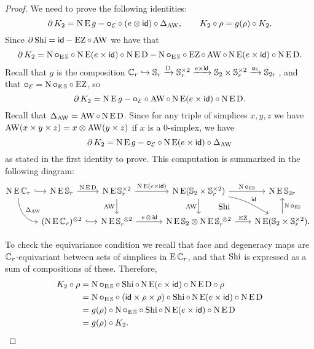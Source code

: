\begin{proof}
	We need to prove the following identities:
	\[
	\bd K_2 =  \chains\EE g - \bcirc_{\BE} \comp (e \ot \id) \comp \Delta_{\AW},
	\qquad
	K_2 \comp \rho = g(\rho) \comp K_2.
	\]
	Since $\bd \Shi = \id - \EZ \comp \AW$ we have that
	\[
	\bd K_2 =
	\chains\bcirc_{\EE\sym} \comp \chains\EE(e \times \id) \comp \chains\EE\rD -
	\chains\bcirc_{\EE\sym} \comp \EZ \comp \AW \comp \chains\EE(e \times \id) \comp \chains\EE\rD.
	\]
	Recall that $g$ is the composition $\cyc_r \hookrightarrow \sym_r \xra{\rD} \sym_r^{\times 2} \xra{e \times \id} \sym_2 \times \sym_r^{\times 2} \xra{\bcirc_{\sym}} \sym_{2r}$\,, and that $\bcirc_{\BE} = \chains\bcirc_{\EE\sym} \comp \EZ$, so
	\[
	\bd K_2 =
	\chains\EE g -
	\bcirc_{\BE} \comp \AW \comp \chains\EE(e \times \id) \comp \chains\EE\rD.
	\]
	Recall that $\Delta_{\AW} = \AW \comp \chains\EE\rD$.
	Since for any triple of simplices $x,y,z$ we have $\AW(x \times y \times z) = x \ot \AW(y \times z)$ if $x$ is a $0$-simplex, we have
	\[
	\bd K_2 =
	\chains\EE g -
	\bcirc_{\BE} \comp \chains\EE(e \times \id) \comp \Delta_{\AW}
	\]
	as stated in the first identity to prove.
	This computation is summarized in the following diagram:
	\[
	\hspace*{-4pt}
	\begin{tikzcd}
		\chains\EE\cyc_r
		\rar[hook]
		\arrow[dr,in=180,out=-90,"\Delta_{\AW}"]
		&[-20pt]
		\chains\EE\sym_r
		\rar["\chains\EE\rD"] &[-10pt]
		\chains\EE\sym_r^{\times 2}
		\rar["\chains\EE(e \times \id)"]
		\dar["\AW"'] &[7pt]
		\chains\EE(\sym_2 \times \sym_r^{\times 2})
		\rar["\chains\bcirc_{\EE\!\sym}"]
		\dar["\AW"']
		\drar["\id",out=-10,in=150] &[-5pt]
		\chains\EE\sym_{2r} \\ &
		(\chains\EE\cyc_r)^{\ot 2}
		\arrow[r,hook] &
		\chains\EE\sym_r^{\ \ot 2}
		\rar["e \,\ot\, \id"] &
		\chains\EE\sym_2 \ot \chains\EE\sym_r^{\ \ot 2}
		\rar["\EZ"]
		\uar["\Shi",phantom,shift right=30pt] &
		\chains\EE(\sym_2 \times \sym_r^{\times 2}).
		\uar["\chains\bcirc_{\EE\!\sym}"']
	\end{tikzcd}
	\]

	To check the equivariance condition we recall that face and degeneracy maps are $\cyc_r$-equivariant between sets of simplices in $\EE\cyc_r$, and that $\Shi$ is expressed as a sum of compositions of these.
	Therefore,
	\begin{align*}
		K_2 \comp \rho &=
		\chains\bcirc_{\EE\sym} \comp \Shi \comp \chains\EE(e \times \id) \comp \chains\EE\rD \comp \rho \\ &=
		\chains\bcirc_{\EE\sym} \comp (\id \times \rho \times \rho) \comp \Shi \comp \chains\EE(e \times \id) \comp \chains\EE\rD  \\ &=
		g(\rho) \comp \chains\bcirc_{\EE\sym} \comp \Shi \comp \chains\EE(e \times \id) \comp \chains\EE\rD \\ &=
		g(\rho) \comp K_2. \qedhere
	\end{align*}
\end{proof}

